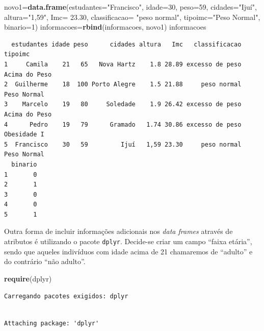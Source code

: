 \documentclass[12pt,brazil,]{book}
\newenvironment{Shaded}{\begin{snugshade}}{\end{snugshade}}
\newcommand{\DataTypeTok}[1]{\textcolor[rgb]{0.13,0.29,0.53}{#1}}
\newcommand{\DecValTok}[1]{\textcolor[rgb]{0.00,0.00,0.81}{#1}}
\newcommand{\FloatTok}[1]{\textcolor[rgb]{0.00,0.00,0.81}{#1}}
\newcommand{\KeywordTok}[1]{\textcolor[rgb]{0.13,0.29,0.53}{\textbf{#1}}}
\newcommand{\NormalTok}[1]{#1}
\newcommand{\StringTok}[1]{\textcolor[rgb]{0.31,0.60,0.02}{#1}}
\begin{document}
\begin{Shaded}
\begin{Highlighting}[]
\NormalTok{novo1=}\KeywordTok{data.frame}\NormalTok{(}\DataTypeTok{estudantes=}\StringTok{"Francisco"}\NormalTok{, }\DataTypeTok{idade=}\DecValTok{30}\NormalTok{, }\DataTypeTok{peso=}\DecValTok{59}\NormalTok{, }
                 \DataTypeTok{cidades=}\StringTok{"Ijuí"}\NormalTok{, }
                 \DataTypeTok{altura=}\StringTok{"1,59"}\NormalTok{, }
                 \DataTypeTok{Imc=} \FloatTok{23.30}\NormalTok{, }
                 \DataTypeTok{classificacao=} \StringTok{"peso normal"}\NormalTok{,}
                 \DataTypeTok{tipoimc=}\StringTok{"Peso Normal"}\NormalTok{, }
                 \DataTypeTok{binario=}\DecValTok{1}\NormalTok{)}
\NormalTok{informacoes=}\KeywordTok{rbind}\NormalTok{(informacoes, novo1)}
\NormalTok{informacoes}
\end{Highlighting}
\end{Shaded}

\begin{verbatim}
  estudantes idade peso      cidades altura   Imc   classificacao       tipoimc
1     Camila    21   65   Nova Hartz    1.8 28.89 excesso de peso Acima do Peso
2  Guilherme    18  100 Porto Alegre    1.5 21.88     peso normal   Peso Normal
3    Marcelo    19   80     Soledade    1.9 26.42 excesso de peso Acima do Peso
4      Pedro    19   79      Gramado   1.74 30.86 excesso de peso   Obesidade I
5  Francisco    30   59         Ijuí   1,59 23.30     peso normal   Peso Normal
  binario
1       0
2       1
3       0
4       0
5       1
\end{verbatim}

Outra forma de incluir informações adicionais nos \emph{data frames}
através de atributos é utilizando o pacote \texttt{dplyr}. Decide-se
criar um campo ``faixa etária'', sendo que aqueles indivíduos com idade
acima de 21 chamaremos de ``adulto'' e do contrário ``não adulto''.

\begin{Shaded}
\begin{Highlighting}[]
\KeywordTok{require}\NormalTok{(dplyr)}
\end{Highlighting}
\end{Shaded}

\begin{verbatim}
Carregando pacotes exigidos: dplyr
\end{verbatim}

\begin{verbatim}

Attaching package: 'dplyr'
\end{verbatim}
\end{document}
